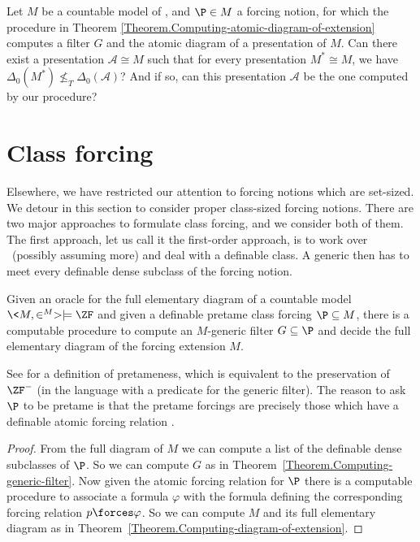 \documentclass{amsart}
\begin{document}
 \begin{question}
 Let $M$ be a countable model of \ZFC, and $\P\in M$ a forcing notion, for which the
 procedure in Theorem  \ref{Theorem.Computing-atomic-diagram-of-extension} computes
 a filter $G$ and the atomic diagram of a presentation of $M$.  Can there exist a
 presentation $\mathcal A\cong M$ such that for every presentation ${M^*} \cong M$, we have $\Delta_0({M^*}) \not \leq_T \Delta_0(\mathcal A)$?  And if so, can this presentation $\mathcal A$ be the one computed by our procedure?
 \end{question}
 
 
 
 \section{Class forcing}\label{Section.Class-forcing}
 
 Elsewhere, we have restricted our attention to forcing notions which are set-sized. We detour in this section to consider proper class-sized forcing notions. There are two major approaches to formulate class forcing, and we consider both of them.
 The first approach, let us call it the first-order approach, is to work over \ZF\  (possibly assuming more) and deal with a definable class. A generic then has to meet every definable dense subclass of the forcing notion.
 
 \begin{theorem}
 Given an oracle for the full elementary diagram of a countable model $\<M,\in^M> \models \ZF$ and given a definable pretame class forcing $\P \subseteq M$, there is a computable procedure to compute an $M$-generic filter $G \subseteq \P$ and decide the full elementary diagram of the forcing extension $M$.
 \end{theorem}
 
 See \cite{friedman:book} for a definition of pretameness, which is equivalent to the preservation of $\ZF^-$ (in the language with a predicate for the generic filter). The reason to ask $\P$ to be pretame is that the pretame forcings are precisely those which have a definable atomic forcing relation \cite{HKS2018}.
 
 \begin{proof}
 From the full diagram of $M$ we can compute a list of the definable dense subclasses of $\P$. So we can compute $G$ as in Theorem~\ref{Theorem.Computing-generic-filter}. Now given the atomic forcing relation for $\P$ there is a computable procedure to associate a formula $\varphi$ with the formula defining the corresponding forcing relation $p \forces \varphi$. So we can compute $M$ and its full elementary diagram as in Theorem~\ref{Theorem.Computing-diagram-of-extension}.
 \end{proof}
 
\end{document}
